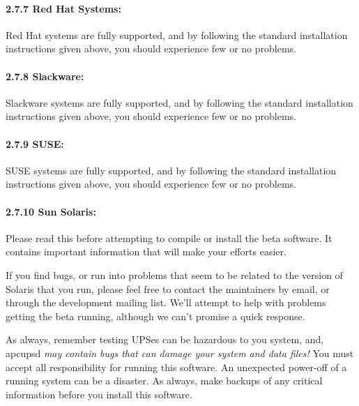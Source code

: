 \label{Red-Hat-Systems}

\paragraph*{2.7.7 Red Hat Systems:}

\label{index-Red-Hat-44}
\label{index-OS_002c-Red-Hat-45}
Red Hat systems are fully supported, and by following the standard
installation instructions given above, you should experience few or no
problems. 

\label{Slackware}

\paragraph*{2.7.8 Slackware:}

\label{index-Slackware-46}
\label{index-OS_002c-Slackware-47}
Slackware systems are fully supported, and by following the standard
installation instructions given above, you should experience few or no
problems. 

\label{SUSE}

\paragraph*{2.7.9 SUSE:}

\label{index-SuSE-48}
\label{index-OS_002c-SuSE-49}
SUSE systems are fully supported, and by following the standard installation
instructions given above, you should experience few or no problems. 

\label{Sun-Solaris}

\paragraph*{2.7.10 Sun Solaris:}

\label{index-Sun-50}
\label{index-Solaris-51}
\label{index-OS_002c-Solaris-52}
Please read this before attempting to compile or install the beta software. It
contains important information that will make your efforts easier.  

If you find bugs, or run into problems that seem to be related to the version
of Solaris that you run, please feel free to contact the maintainers by email,
or through the development mailing list. We'll attempt to help with problems
getting the beta running, although we can't promise a quick response.  

As always, remember testing UPSes can be hazardous to you system, and, apcupsd
{\it may contain bugs that can damage your system and data files!} You must
accept all responsibility for running this software. An unexpected power-off
of a running system can be a disaster. As always, make backups of any critical
information before you install this software.  

